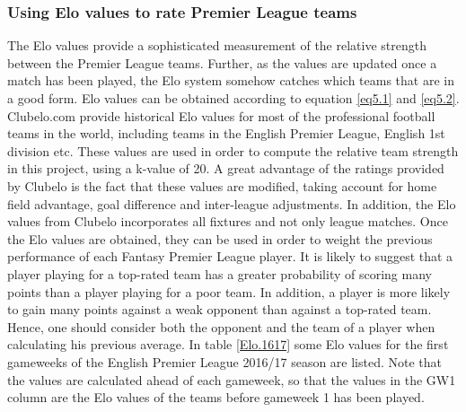 \subsubsection{Using Elo values to rate Premier League teams}
The Elo values provide a sophisticated measurement of the relative strength between the Premier League teams. Further, as the values are updated once a match has been played, the Elo system somehow catches which teams that are in a good form. Elo values can be obtained according to equation \ref{eq5.1} and \ref{eq5.2}. Clubelo.com provide historical Elo values for most of the professional football teams in the world, including teams in the English Premier League, English 1st division etc. These values are used in order to compute the relative team strength in this project, using a k-value of 20. A great advantage of the ratings provided by Clubelo is the fact that these values are modified, taking account for home field advantage, goal difference and inter-league adjustments. In addition, the Elo values from Clubelo incorporates all fixtures and not only league matches.
\newpar
Once the Elo values are obtained, they can be used in order to weight the previous performance of each Fantasy Premier League player. It is likely to suggest that a player playing for a top-rated team has a greater probability of scoring many points than a player playing for a poor team. In addition, a player is more likely to gain many points against a weak opponent than against a top-rated team. Hence, one should consider both the opponent and the team of a player when calculating his previous average. 
\newpar
In table \ref{Elo.1617} some Elo values for the first gameweeks of the English Premier League 2016/17 season are listed. Note that the values are calculated ahead of each gameweek, so that the values in the GW1 column are the Elo values of the teams before gameweek 1 has been played. 

